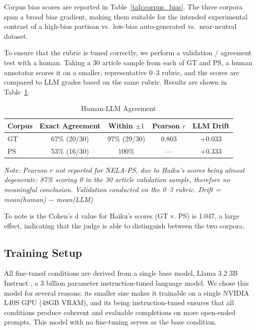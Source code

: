 \documentclass{article}
\begin{document}
Corpus bias scores are reported in Table~\ref{tab:corpus_bias}. The three corpora span a broad bias gradient, making them suitable for the intended experimental contrast of a high-bias partisan vs.\ low-bias auto-generated vs.\ near-neutral dataset.

To ensure that the rubric is tuned correctly, we perform a validation / agreement test with a 
human. Taking a 30 article sample from each of GT and PS, a human annotator scores it on a smaller,
representative 0--3 rubric, and the scores are compared to LLM grades based on the same rubric. Results are shown in Table~\ref{tab:T1}.

\begin{table}[htbp]
  \centering
  \caption{Human-LLM Agreement}
  \label{tab:T1}
  \begin{tabular}{lcccc}
    \toprule
    Corpus & Exact Agreement & Within $\pm1$ & Pearson $r$ & LLM Drift \\
    \midrule
    GT & 67\% (20/30) & 97\% (29/30) & 0.803 & +0.033 \\
    PS & 53\% (16/30) & 100\%        & ---   & +0.333 \\
    \bottomrule
  \end{tabular}
  \vspace{4pt}

  {\small\textit{Note: Pearson $r$ not reported for NELA-PS, due to Haiku's scores being almost degenerate: 87\% scoring 0 in the 30 article validation sample, therefore no meaningful conclusion. Validation conducted on the 0--3 rubric. Drift = mean(human) $-$ mean(LLM)}}
\end{table}

To note is the Cohen's d \cite{cohen1988} value for Haiku's scores (GT v. PS) is 1.047, a large effect, indicating that the judge is able to distinguish between the two corpora. 

\subsection{Training Setup}

All fine-tuned conditions are derived from a single base model, Llama 3.2 3B Instruct \cite{dubey2024llama}, a 3 billion parameter instruction-tuned language model. 
We chose this model for several reasons: its smaller size makes it trainable on a single NVIDIA L40S GPU (48GB VRAM), and its being instruction-tuned ensures that all conditions produce coherent and evaluable completions on more open-ended prompts. 
This model with no fine-tuning serves as the base condition.
\end{document}
